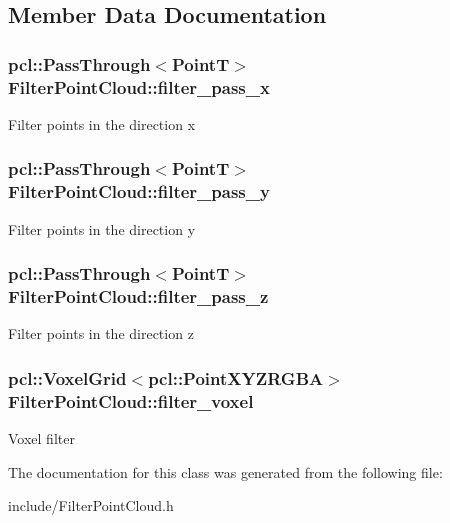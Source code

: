 \subsection{Member Data Documentation}
\hypertarget{classFilterPointCloud_af657b269e7d2b17ede230f0193ceb332}{
\subsubsection[{filter\-\_\-pass\-\_\-x}]{\setlength{\rightskip}{0pt plus 5cm}pcl\-::\-Pass\-Through$<$Point\-T$>$ Filter\-Point\-Cloud\-::filter\-\_\-pass\-\_\-x\hspace{0.3cm}{\ttfamily [private]}}}\label{classFilterPointCloud_af657b269e7d2b17ede230f0193ceb332}
Filter points in the direction x \hypertarget{classFilterPointCloud_a9340b74286052b5ac7de9eadd2e0a6b3}{
\subsubsection[{filter\-\_\-pass\-\_\-y}]{\setlength{\rightskip}{0pt plus 5cm}pcl\-::\-Pass\-Through$<$Point\-T$>$ Filter\-Point\-Cloud\-::filter\-\_\-pass\-\_\-y\hspace{0.3cm}{\ttfamily [private]}}}\label{classFilterPointCloud_a9340b74286052b5ac7de9eadd2e0a6b3}
Filter points in the direction y \hypertarget{classFilterPointCloud_a3cf0458f538181a07634ba2d33ae0b95}{
\subsubsection[{filter\-\_\-pass\-\_\-z}]{\setlength{\rightskip}{0pt plus 5cm}pcl\-::\-Pass\-Through$<$Point\-T$>$ Filter\-Point\-Cloud\-::filter\-\_\-pass\-\_\-z\hspace{0.3cm}{\ttfamily [private]}}}\label{classFilterPointCloud_a3cf0458f538181a07634ba2d33ae0b95}
Filter points in the direction z \hypertarget{classFilterPointCloud_a02984936aef2ec44e87681f6d36f69cc}{
\subsubsection[{filter\-\_\-voxel}]{\setlength{\rightskip}{0pt plus 5cm}pcl\-::\-Voxel\-Grid$<$pcl\-::\-Point\-X\-Y\-Z\-R\-G\-B\-A$>$ Filter\-Point\-Cloud\-::filter\-\_\-voxel\hspace{0.3cm}{\ttfamily [private]}}}\label{classFilterPointCloud_a02984936aef2ec44e87681f6d36f69cc}
Voxel filter 

The documentation for this class was generated from the following file\-:\begin{DoxyCompactItemize}
\item 
include/Filter\-Point\-Cloud.\-h\end{DoxyCompactItemize}
